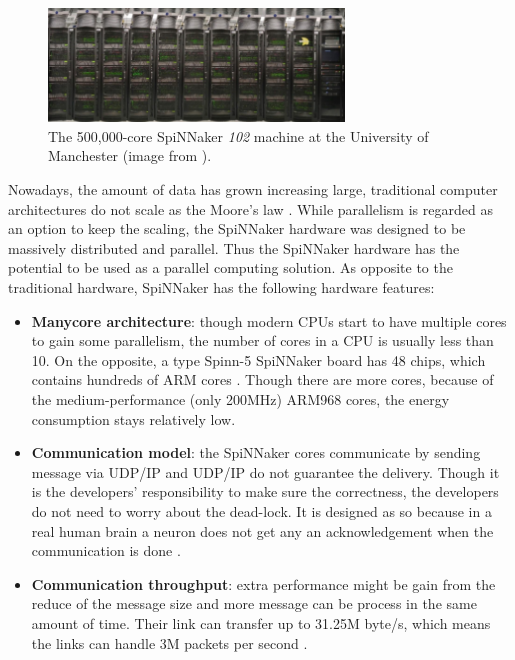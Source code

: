 \begin{figure}[!tb]
   \centering
       \includegraphics[width=0.7\textwidth]{figures/cluster.png}
       \caption{The 500,000-core SpiNNaker \textit{102} machine at the University of Manchester (image from \cite{spinn-core}).}
       \label{fig:cluster}
\end{figure}


Nowadays, the amount of data has grown increasing large, traditional computer architectures do not scale as the Moore's law \cite{schaller1997moore}. While parallelism is regarded as an option to keep the scaling, the SpiNNaker hardware was designed to be massively distributed and parallel. Thus the SpiNNaker hardware has the potential to be used as a parallel computing solution. As opposite to the traditional hardware, SpiNNaker has the following hardware features:

\begin{itemize}
\item \textbf{Manycore architecture}: though modern CPUs start to have multiple cores to gain some parallelism, the number of cores in a CPU is usually less than 10. On the opposite, a type Spinn-5 SpiNNaker board has 48 chips, which contains hundreds of ARM cores \cite{5th-summit}. Though there are more cores, because of the medium-performance (only 200MHz) ARM968 cores, the energy consumption stays relatively low.

\item \textbf{Communication model}: the SpiNNaker cores communicate by sending message via UDP/IP \cite{ws6} and UDP/IP do not guarantee the delivery. Though it is the developers' responsibility to make sure the correctness, the developers do not need to worry about the dead-lock. It is designed as so because in a real human brain a neuron does not get any an acknowledgement when the communication is done \cite{spinnaker}.

\item \textbf{Communication throughput}: extra performance might be gain from the reduce of the message size and more message can be process in the same amount of time\cite{furber2012overview}. Their link can transfer up to 31.25M byte/s, which means the links can handle 3M packets per second \cite{ws6}.\\
\end{itemize}

